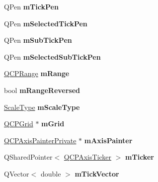 \begin{DoxyCompactItemize}
\mbox{\label{classQCPAxis_a1d52c78c856d8bd1f331d4ec4e63d944}} 
Q\+Pen {\bfseries m\+Tick\+Pen}
\item 
\mbox{\label{classQCPAxis_a9524593dbc75a5c5b29dbd1cb4b37df5}} 
Q\+Pen {\bfseries m\+Selected\+Tick\+Pen}
\item 
\mbox{\label{classQCPAxis_a32ef56d3a417866720eb12667d27dbd1}} 
Q\+Pen {\bfseries m\+Sub\+Tick\+Pen}
\item 
\mbox{\label{classQCPAxis_aa5cc6afc5dc2a365f5abbd36eb04a1dc}} 
Q\+Pen {\bfseries m\+Selected\+Sub\+Tick\+Pen}
\item 
\mbox{\label{classQCPAxis_a1ee36773c49062d751560e11f90845f7}} 
\hyperlink{classQCPRange}{Q\+C\+P\+Range} {\bfseries m\+Range}
\item 
\mbox{\label{classQCPAxis_a5cb034f57aa3d773a9ca55a0931dbf7b}} 
bool {\bfseries m\+Range\+Reversed}
\item 
\mbox{\label{classQCPAxis_ad706039549cbbbec5fcb2baf7894e04d}} 
\hyperlink{classQCPAxis_a36d8e8658dbaa179bf2aeb973db2d6f0}{Scale\+Type} {\bfseries m\+Scale\+Type}
\item 
\mbox{\label{classQCPAxis_a17bffb94aaa40311f259c6ac7bcb5d5f}} 
\hyperlink{classQCPGrid}{Q\+C\+P\+Grid} $\ast$ {\bfseries m\+Grid}
\item 
\mbox{\label{classQCPAxis_aeeae00935bd2dab82d64f32544a90913}} 
\hyperlink{classQCPAxisPainterPrivate}{Q\+C\+P\+Axis\+Painter\+Private} $\ast$ {\bfseries m\+Axis\+Painter}
\item 
\mbox{\label{classQCPAxis_ad9c3061cbd8bec5b0755d5a0bef3b700}} 
Q\+Shared\+Pointer$<$ \hyperlink{classQCPAxisTicker}{Q\+C\+P\+Axis\+Ticker} $>$ {\bfseries m\+Ticker}
\item 
\mbox{\label{classQCPAxis_aae0f9b9973b85be601200f00f5825087}} 
Q\+Vector$<$ double $>$ {\bfseries m\+Tick\+Vector}
\item 
\mbox{\label{classQCPAxis_aeee4bd0fca3f587eafe33843d1cb4f82}} 

\end{DoxyCompactItemize}
